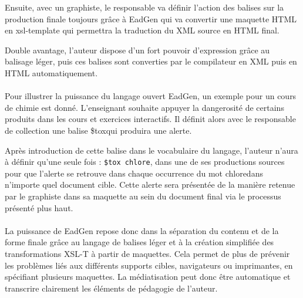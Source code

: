 Ensuite, avec un graphiste, le responsable va définir l'action des balises sur la production finale toujours grâce à EadGen qui va convertir une maquette HTML en xsl-template qui permettra la traduction du XML source en HTML final.

Double avantage, l'auteur dispose d'un fort pouvoir d'expression grâce au balisage léger, puis ces balises sont converties par le compilateur en XML puis en HTML automatiquement.

\paragraph{}
Pour illustrer la puissance du langage ouvert EadGen, un exemple pour un cours de chimie est donné. L'enseignant souhaite appuyer la dangerosité de certains produits dans les cours et exercices interactifs. Il définit alors avec le responsable de collection une balise \og{}\$tox\fg qui produira une alerte.

Après introduction de cette balise dans le vocabulaire du langage, l'auteur n'aura à définir qu'une seule fois : \texttt{\$tox chlore}, dans une de ses productions sources pour que l'alerte se retrouve dans chaque occurrence du mot \og{}chlore\fg dans n'importe quel document cible. Cette alerte sera présentée de la manière retenue par le graphiste dans sa maquette au sein du document final via le processus présenté plus haut.

\paragraph{}
La puissance de EadGen repose donc dans la séparation du contenu et de la forme finale grâce au langage de balises léger et à la création simplifiée des transformations XSL-T à partir de maquettes. Cela permet de plus de prévenir les problèmes liés aux différents supports cibles, navigateurs ou imprimantes, en spécifiant plusieurs maquettes. La médiatisation peut donc être automatique et transcrire clairement les éléments de pédagogie de l'auteur.